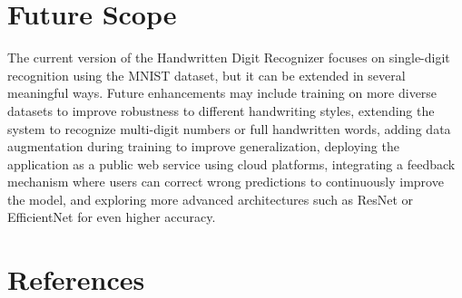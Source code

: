 \documentclass[12pt,a4paper]{report}
\begin{document}
\section{Future Scope}
The current version of the Handwritten Digit Recognizer focuses on single-digit recognition using the MNIST dataset, but it can be extended in several meaningful ways. Future enhancements may include training on more diverse datasets to improve robustness to different handwriting styles, extending the system to recognize multi-digit numbers or full handwritten words, adding data augmentation during training to improve generalization, deploying the application as a public web service using cloud platforms, integrating a feedback mechanism where users can correct wrong predictions to continuously improve the model, and exploring more advanced architectures such as ResNet or EfficientNet for even higher accuracy.

\newpage
\section*{References}
\end{document}
